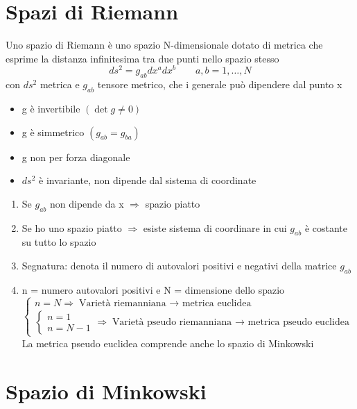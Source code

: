 \documentclass[a4paper,11pt]{report}
\theoremstyle{remark}
\theoremstyle{definition}
\begin{document}
\section{Spazi di Riemann}
Uno spazio di Riemann è uno spazio N-dimensionale dotato di metrica che esprime la distanza infinitesima tra due punti nello spazio stesso
\begin{equation*}
    ds^2 = g_{ab}dx^adx^b \qquad a,b = 1,\dots, N
\end{equation*}
con $ds^2$ metrica e $g_{ab}$ tensore metrico, che i generale può dipendere dal punto x
\begin{itemize}
    \item g è invertibile $(\det{g}\neq 0)$
    \item g è simmetrico $(g_{ab}=g_{ba})$
    \item g non per forza diagonale
    \item $ds^2$ è invariante, non dipende dal sistema di coordinate
\end{itemize}
\begin{enumerate}
    \item Se $g_{ab}$ non dipende da x $\Rightarrow$ spazio piatto
    \item Se ho uno spazio piatto $\Rightarrow$ esiste sistema di coordinare in cui $g_{ab}$ è costante su tutto lo spazio
    \item Segnatura: denota il numero di autovalori positivi e negativi della matrice $g_{ab}$
    \item n = numero autovalori positivi e N = dimensione dello spazio
    \begin{equation*}
        \begin{cases}
            n = N \Rightarrow \text{Varietà riemanniana $\rightarrow$ metrica euclidea} \\
            \begin{cases}
                n = 1 \\
                n = N-1 
            \end{cases}
            \Rightarrow \text{Varietà pseudo riemanniana $\rightarrow$ metrica pseudo euclidea}
        \end{cases}
    \end{equation*}
    La metrica pseudo euclidea comprende anche lo spazio di Minkowski
\end{enumerate}

\section{Spazio di Minkowski}
\end{document}
